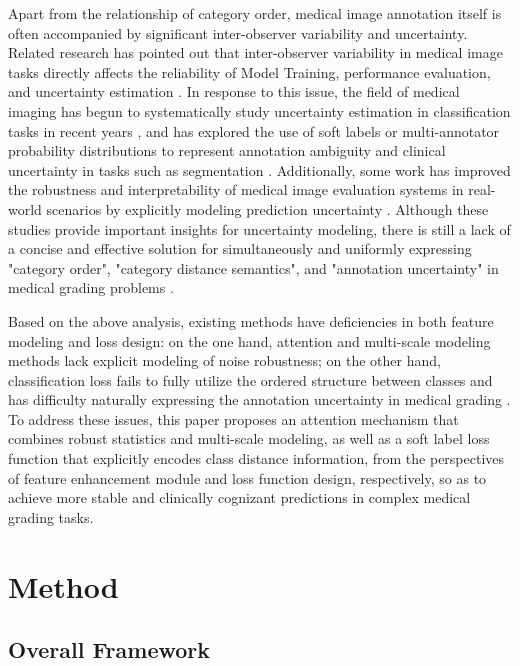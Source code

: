 \documentclass[letterpaper, 10 pt, conference]{ieeeconf}  %
\begin{document}
Apart from the relationship of category order, medical image annotation itself is often accompanied by significant inter-observer variability and uncertainty. Related research has pointed out that inter-observer variability in medical image tasks directly affects the reliability of Model Training, performance evaluation, and uncertainty estimation \cite{24}. In response to this issue, the field of medical imaging has begun to systematically study uncertainty estimation in classification tasks in recent years \cite{23}, and has explored the use of soft labels or multi-annotator probability distributions to represent annotation ambiguity and clinical uncertainty in tasks such as segmentation \cite{25}\cite{26}. Additionally, some work has improved the robustness and interpretability of medical image evaluation systems in real-world scenarios by explicitly modeling prediction uncertainty \cite{27}. Although these studies provide important insights for uncertainty modeling, there is still a lack of a concise and effective solution for simultaneously and uniformly expressing "category order", "category distance semantics", and "annotation uncertainty" in medical grading problems \cite{9}\cite{10}\cite{23}\cite{25}\cite{26}\cite{27}.

Based on the above analysis, existing methods have deficiencies in both feature modeling and loss design: on the one hand, attention and multi-scale modeling methods lack explicit modeling of noise robustness; on the other hand, classification loss fails to fully utilize the ordered structure between classes and has difficulty naturally expressing the annotation uncertainty in medical grading \cite{3}\cite{9}\cite{10}\cite{23}\cite{24}\cite{25}\cite{26}\cite{27}. To address these issues, this paper proposes an attention mechanism that combines robust statistics and multi-scale modeling, as well as a soft label loss function that explicitly encodes class distance information, from the perspectives of feature enhancement module and loss function design, respectively, so as to achieve more stable and clinically cognizant predictions in complex medical grading tasks.


\section{Method}

\subsection{Overall Framework}
\end{document}
